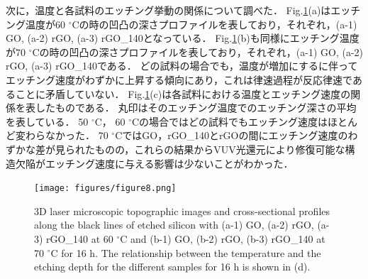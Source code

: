 \documentclass[platex,dvipdfmx]{jlreq}			%
\begin{document}
次に，温度と各試料のエッチング挙動の関係について調べた．
Fig.\ref{fig:Etching_temp}(a)はエッチング温度が60 ${}^\circ$Cの時の凹凸の深さプロファイルを表しており，それぞれ，(a-1) GO, (a-2) rGO, (a-3) rGO\_140となっている．
Fig.\ref{fig:Etching_temp}(b)も同様にエッチング温度が70 ${}^\circ$Cの時の凹凸の深さプロファイルを表しており，それぞれ，(a-1) GO, (a-2) rGO, (a-3) rGO\_140である．
どの試料の場合でも，温度が増加にするに伴ってエッチング速度がわずかに上昇する傾向にあり，これは律速過程が反応律速であることに矛盾していない．
Fig.\ref{fig:Etching_temp}(c)は各試料における温度とエッチング速度の関係を表したものである．
丸印はそのエッチング温度でのエッチング深さの平均を表している．
50 ${}^\circ$C， 60 ${}^\circ$Cの場合ではどの試料でもエッチング速度はほとんど変わらなかった．
70 ${}^\circ$CではGO，rGO\_140とrGOの間にエッチング速度のわずかな差が見られたものの，これらの結果からVUV光還元により修復可能な構造欠陥がエッチング速度に与える影響は少ないことがわかった．


\begin{figure}[H]
    \centering
    \texttt{[image: figures/figure8.png]}
    \caption{3D laser microscopic topographic images and cross-sectional profiles along the black lines of etched silicon with (a-1) GO, (a-2) rGO, (a-3) rGO\_140 at 60 ${}^\circ$C and (b-1) GO, (b-2) rGO, (b-3) rGO\_140 at 70 ${}^\circ$C for 16 h. The relationship between the temperature and the etching depth for the different samples for 16 h is shown in (d).}
    \label{fig:Etching_temp}
\end{figure}



\end{document}
